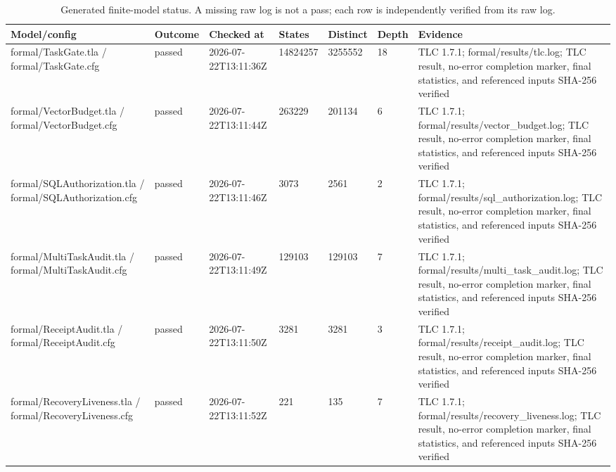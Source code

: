 
\begin{table}[t]
\centering
\caption{Generated finite-model status.  A missing raw log is not a pass; each row is independently verified from its raw log.}
\label{tab:formal-status}
\scriptsize
\begin{tabular}{p{}lllllp{}}
\toprule
Model/config & Outcome & Checked at & States & Distinct & Depth & Evidence \\
\midrule
\parbox[t]{0.20\textwidth}{formal/TaskGate.tla / formal/TaskGate.cfg} & passed & 2026-07-22T13:11:36Z & 14824257 & 3255552 & 18 & \parbox[t]{0.30\textwidth}{TLC 1.7.1; formal/results/tlc.log; TLC result, no-error completion marker, final statistics, and referenced inputs SHA-256 verified} \\
\parbox[t]{0.20\textwidth}{formal/VectorBudget.tla / formal/VectorBudget.cfg} & passed & 2026-07-22T13:11:44Z & 263229 & 201134 & 6 & \parbox[t]{0.30\textwidth}{TLC 1.7.1; formal/results/vector\_budget.log; TLC result, no-error completion marker, final statistics, and referenced inputs SHA-256 verified} \\
\parbox[t]{0.20\textwidth}{formal/SQLAuthorization.tla / formal/SQLAuthorization.cfg} & passed & 2026-07-22T13:11:46Z & 3073 & 2561 & 2 & \parbox[t]{0.30\textwidth}{TLC 1.7.1; formal/results/sql\_authorization.log; TLC result, no-error completion marker, final statistics, and referenced inputs SHA-256 verified} \\
\parbox[t]{0.20\textwidth}{formal/MultiTaskAudit.tla / formal/MultiTaskAudit.cfg} & passed & 2026-07-22T13:11:49Z & 129103 & 129103 & 7 & \parbox[t]{0.30\textwidth}{TLC 1.7.1; formal/results/multi\_task\_audit.log; TLC result, no-error completion marker, final statistics, and referenced inputs SHA-256 verified} \\
\parbox[t]{0.20\textwidth}{formal/ReceiptAudit.tla / formal/ReceiptAudit.cfg} & passed & 2026-07-22T13:11:50Z & 3281 & 3281 & 3 & \parbox[t]{0.30\textwidth}{TLC 1.7.1; formal/results/receipt\_audit.log; TLC result, no-error completion marker, final statistics, and referenced inputs SHA-256 verified} \\
\parbox[t]{0.20\textwidth}{formal/RecoveryLiveness.tla / formal/RecoveryLiveness.cfg} & passed & 2026-07-22T13:11:52Z & 221 & 135 & 7 & \parbox[t]{0.30\textwidth}{TLC 1.7.1; formal/results/recovery\_liveness.log; TLC result, no-error completion marker, final statistics, and referenced inputs SHA-256 verified} \\
\bottomrule
\end{tabular}
\end{table}
